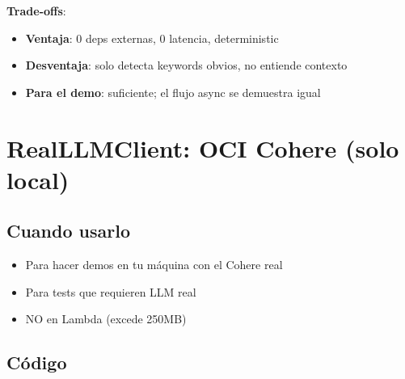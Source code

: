 \documentclass[11pt,a4paper,oneside]{article}
\newcommand{\ok}{\textcolor{okgreen}{\textbf{\checkmark}}}
\newcommand{\err}{\textcolor{errred}{\textbf{\ding{55}}}}
\begin{document}
\textbf{Trade-offs}:
\begin{itemize}
  \item \ok \textbf{Ventaja}: 0 deps externas, 0 latencia, deterministic
  \item \err \textbf{Desventaja}: solo detecta keywords obvios, no entiende contexto
  \item \ok \textbf{Para el demo}: suficiente; el flujo async se demuestra igual
\end{itemize}

\section{RealLLMClient: OCI Cohere (solo local)}

\subsection{Cuando usarlo}

\begin{itemize}
  \item Para hacer demos en tu m\'aquina con el Cohere real
  \item Para tests que requieren LLM real
  \item NO en Lambda (excede 250MB)
\end{itemize}

\subsection{C\'odigo}
\end{document}
